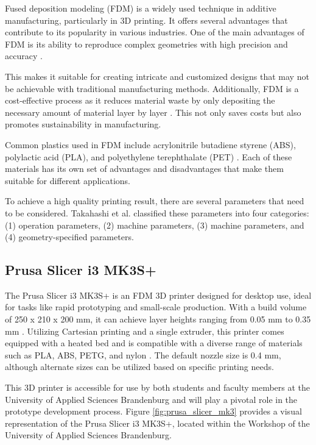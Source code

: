 Fused deposition modeling (FDM) is a widely used technique in additive manufacturing, particularly in 3D printing. It offers several advantages that contribute to its popularity in various industries. One of the main advantages of FDM is its ability to reproduce complex geometries with high precision and accuracy \cite{Gordeev18}.

This makes it suitable for creating intricate and customized designs that may not be achievable with traditional manufacturing methods. Additionally, FDM is a cost-effective process as it reduces material waste by only depositing the necessary amount of material layer by layer \cite{Gordeev18}. This not only saves costs but also promotes sustainability in manufacturing.

Common plastics used in FDM include acrylonitrile butadiene styrene (ABS), polylactic acid (PLA), and polyethylene terephthalate (PET) \cite{Teamm17}. Each of these materials has its own set of advantages and disadvantages that make them suitable for different applications.

To achieve a high quality printing result, there are several parameters that need to be considered. Takahashi et al. \cite{Takahashi17} classified these parameters into four categories: (1) operation parameters, (2) machine parameters, (3) machine parameters, and (4) geometry-specified parameters.

\subsection{Prusa Slicer i3 MK3S+}
\label{subsec:prusa_slicer}

The Prusa Slicer i3 MK3S+ is an FDM 3D printer designed for desktop use, ideal for tasks like rapid prototyping and small-scale production. With a build volume of 250 x 210 x 200 mm, it can achieve layer heights ranging from 0.05 mm to 0.35 mm \cite{Prusa}. Utilizing Cartesian printing and a single extruder, this printer comes equipped with a heated bed and is compatible with a diverse range of materials such as PLA, ABS, PETG, and nylon \cite{Prusa}. The default nozzle size is 0.4 mm, although alternate sizes can be utilized based on specific printing needs.

This 3D printer is accessible for use by both students and faculty members at the University of Applied Sciences Brandenburg and will play a pivotal role in the prototype development process. Figure \ref{fig:prusa_slicer_mk3} provides a visual representation of the Prusa Slicer i3 MK3S+, located within the Workshop of the University of Applied Sciences Brandenburg.

